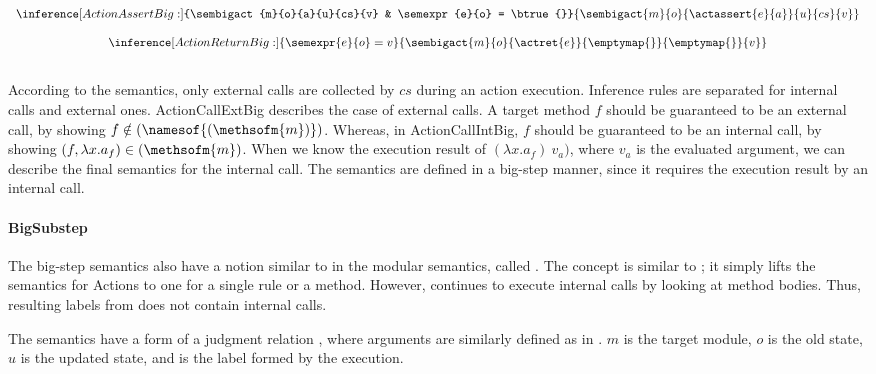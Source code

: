 \begin{definition}
\begin{center}
\begin{math}
\begin{array}{c}
        \mbox{} \\
        \inference[ActionAssertBig:]{\sembigact{m}{o}{a}{u}{cs}{v} & \semexpr{e}{o} = \btrue{}}
                  {\sembigact{m}{o}{\actassert{e}{a}}{u}{cs}{v}} \\
        \mbox{} \\
        \inference[ActionReturnBig:]{\semexpr{e}{o} = v}
                  {\sembigact{m}{o}{\actret{e}}{\emptymap{}}{\emptymap{}}{v}} \\
        \mbox{} \\
      \end{array}
    \end{math}
  \end{center}
\end{definition}

According to the semantics, only external calls are collected by $cs$
during an action execution. Inference rules are separated for internal
calls and external ones. ActionCallExtBig describes the case of
external calls. A target method $f$ should be guaranteed to be an
external call, by showing $f \notin (\namesof{(\methsofm{m})})$.
Whereas, in ActionCallIntBig, $f$ should be guaranteed to be an
internal call, by showing $(f, \lambda x.a_f) \in
(\methsofm{m})$. When we know the execution result of $(\lambda
x.a_f)\ v_a)$, where $v_a$ is the evaluated argument, we can describe
the final semantics for the internal call. The semantics are defined
in a big-step manner, since it requires the execution result by an
internal call.


\paragraph{BigSubstep}

The big-step semantics also have a notion similar to \Substep{} in the
modular semantics, called \Bigsubstep{}. The concept is similar to
\Substep{}; it simply lifts the semantics for Actions to one for a
single rule or a method. However, \Bigsubstep{} continues to execute
internal calls by looking at method bodies. Thus, resulting labels
from \Bigsubstep{} does not contain internal calls.

The \Bigsubstep{} semantics have a form of a judgment relation
, where arguments are similarly
defined as in \Substep{}. $m$ is the target module, $o$ is the old
state, $u$ is the updated state, and  is the
label formed by the execution.

